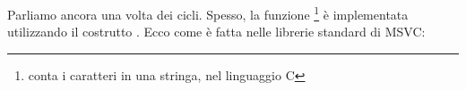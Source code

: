 ﻿Parliamo ancora una volta dei cicli. Spesso, la funzione  
\footnote{conta i caratteri in una stringa, nel linguaggio C} 
è implementata utilizzando il costrutto .
Ecco come è fatta nelle librerie standard di MSVC:
